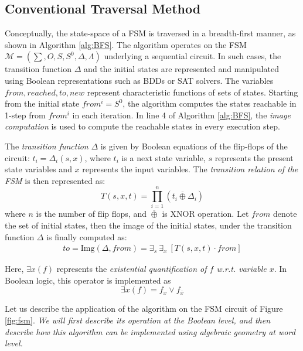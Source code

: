\subsection{Conventional Traversal Method}
Conceptually, the state-space of a FSM is traversed in a breadth-first
manner, as shown in Algorithm \ref{alg:BFS}. %
The algorithm operates on the FSM $\mathcal{M} = (\sum, O, S, S^0,
\Delta, \Lambda)$ underlying a sequential circuit. In such cases, the
transition function $\Delta$ and the initial states are represented
and manipulated using Boolean representations such as BDDs or SAT
solvers. The variables $from, reached, to, new$ represent
characteristic functions of sets of states. Starting from the initial
state $from^i = S^0$, the algorithm computes the states reachable in
1-step from $from^i$ in each iteration. In line 4 of Algorithm
\ref{alg:BFS}, the {\it image computation} is 
used to compute the reachable states in every execution step. 

The {\it transition function} $\Delta$ is given by Boolean equations
  of the flip-flops of the circuit: $t_i = \Delta_i(s, x)$, where
  $t_i$ is a next state variable, $s$ represents the present   state
  variables and $x$ represents the input variables. The {\it
    transition relation of the FSM} is then represented as:  
\begin{equation} 
T(s, x, t) =   \prod_{i=1}^{n} (t_i \overline{\oplus } \Delta_i)
\end{equation}
where $n$ is the number of flip flops, and $\overline{\oplus}$ is XNOR
operation. Let $from$ denote the set of initial states, then the
image of the initial states, under the transition function $\Delta$ is
finally computed as:
\begin{align}
\label{eqn:img}
to = \text{Img}(\Delta, from) = \exists _s ~\exists _x ~[ T(s, x, t)
  \cdot from ] 
\end{align}

Here, $\exists x (f)$ represents the {\it existential quantification
  of $f$ {\it w.r.t.} variable $x$}. In Boolean logic, this operator is implemented as
  $$\exists x (f) = f_x\lor f_{\overline{x}}$$





Let us describe the application of the algorithm on the  FSM circuit
of Figure \ref{fig:fsm}. {\it We will first describe its operation at the
Boolean level, and then describe how this algorithm can be implemented
using algebraic geometry at word level.} 

